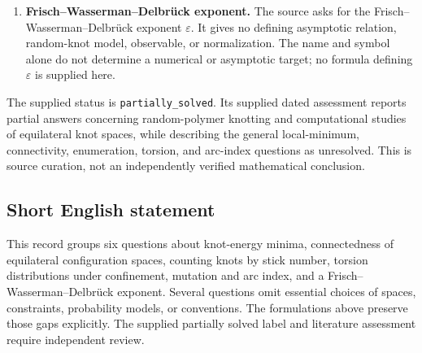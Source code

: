\documentclass[11pt]{article}
\begin{document}
\begin{enumerate}
\item \textbf{Frisch--Wasserman--Delbr\"uck exponent.} The source asks for the Frisch--Wasserman--Delbr\"uck exponent \(\varepsilon\). It gives no defining asymptotic relation, random-knot model, observable, or normalization. The name and symbol alone do not determine a numerical or asymptotic target; no formula defining \(\varepsilon\) is supplied here.
\end{enumerate}

The supplied status is \texttt{partially\_solved}. Its supplied dated assessment reports partial answers concerning random-polymer knotting and computational studies of equilateral knot spaces, while describing the general local-minimum, connectivity, enumeration, torsion, and arc-index questions as unresolved. This is source curation, not an independently verified mathematical conclusion.
\subsection{Short English statement}
This record groups six questions about knot-energy minima, connectedness of equilateral configuration spaces, counting knots by stick number, torsion distributions under confinement, mutation and arc index, and a Frisch--Wasserman--Delbr\"uck exponent. Several questions omit essential choices of spaces, constraints, probability models, or conventions. The formulations above preserve those gaps explicitly. The supplied partially solved label and literature assessment require independent review.
\end{document}
